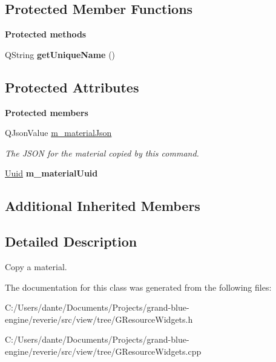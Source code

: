 \subsection*{Protected Member Functions}
\begin{Indent}\textbf{ Protected methods}\par
\begin{DoxyCompactItemize}
\item 
\mbox{\label{classrev_1_1_copy_material_command_ad486462919f3e580e0f7d9861fe1f7c0}} 
Q\+String {\bfseries get\+Unique\+Name} ()
\end{DoxyCompactItemize}
\end{Indent}
\subsection*{Protected Attributes}
\begin{Indent}\textbf{ Protected members}\par
\begin{DoxyCompactItemize}
\item 
\mbox{\label{classrev_1_1_copy_material_command_a6b21fe9da34a515a3ba1d2a1b05b7ade}} 
Q\+Json\+Value \mbox{\hyperlink{classrev_1_1_copy_material_command_a6b21fe9da34a515a3ba1d2a1b05b7ade}{m\+\_\+material\+Json}}
\begin{DoxyCompactList}\small\item\em The J\+S\+ON for the material copied by this command. \end{DoxyCompactList}\item 
\mbox{\label{classrev_1_1_copy_material_command_a6ca18fa194a4b19b0c38d21afcb2c011}} 
\mbox{\hyperlink{classrev_1_1_uuid}{Uuid}} {\bfseries m\+\_\+material\+Uuid}
\end{DoxyCompactItemize}
\end{Indent}
\subsection*{Additional Inherited Members}


\subsection{Detailed Description}
Copy a material. 

The documentation for this class was generated from the following files\+:\begin{DoxyCompactItemize}
\item 
C\+:/\+Users/dante/\+Documents/\+Projects/grand-\/blue-\/engine/reverie/src/view/tree/G\+Resource\+Widgets.\+h\item 
C\+:/\+Users/dante/\+Documents/\+Projects/grand-\/blue-\/engine/reverie/src/view/tree/G\+Resource\+Widgets.\+cpp\end{DoxyCompactItemize}
